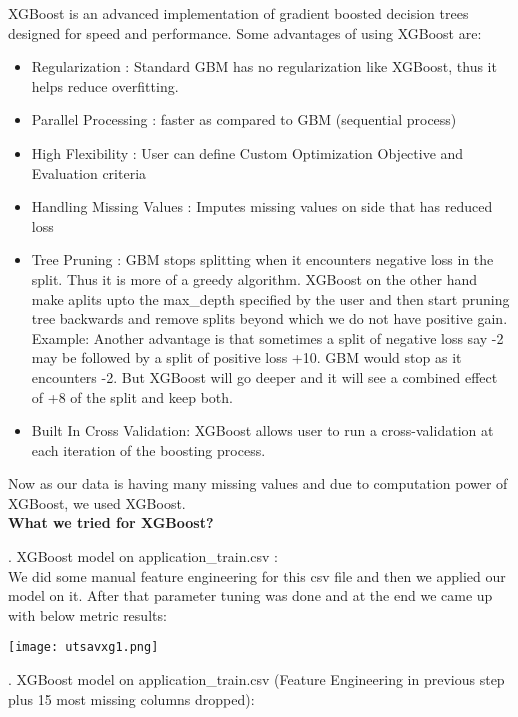 \documentclass[fleqn,10pt]{SelfArx} %
\begin{document}
\begin{itemize}
XGBoost is an advanced implementation of gradient boosted decision trees designed for speed and performance. Some advantages of using XGBoost are:\\
\begin{itemize}
	\item Regularization : Standard GBM has no regularization like XGBoost, thus it helps reduce overfitting.
	\item Parallel Processing : faster as compared to GBM (sequential process)
	\item 	High Flexibility : User can define Custom Optimization Objective and Evaluation criteria
	\item Handling Missing Values : Imputes missing values on side that has reduced loss
	\item 	Tree Pruning : GBM stops splitting when it encounters negative loss in the split. Thus it is more of a greedy algorithm. XGBoost on the other hand make aplits upto the max_depth specified by the user and then start pruning tree backwards and remove splits beyond which we do not have positive gain. \\
	Example: Another advantage is that sometimes a split of negative loss say -2 may be followed by a split of positive loss +10. GBM would stop as it encounters -2. But XGBoost will go deeper and it will see a combined effect of +8 of the split and keep both.
	\item 	Built In Cross Validation: XGBoost allows user to run a cross-validation at each iteration of the boosting process.
\end{itemize}

\noindent
Now as our data is having many missing values and due to computation power of XGBoost, we used XGBoost.\\

\noindent
\textbf{What we tried for XGBoost?}

.	XGBoost model on application_train.csv :\\
We did some manual feature engineering for this csv file and then we applied our model on it. After that parameter tuning was done  and at the end we came up with below metric results:\\
\bigbreak

\texttt{[image: utsavxg1.png]}
\label{fig:results}
 
.	XGBoost model on application_train.csv (Feature Engineering in previous step plus 15 most missing columns dropped):\\


\end{itemize}
\end{document}
